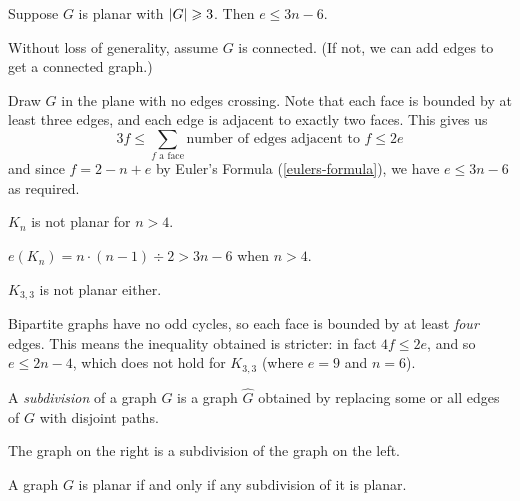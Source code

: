 \documentclass{article}
\begin{document}
\begin{corollary}
    Suppose $G$ is planar with $\left\lvert G \right\rvert \geqslant 3$. Then $e \leq 3n - 6$.
\end{corollary}

\begin{prf}
    Without loss of generality, assume $G$ is connected. (If not, we can add edges to get a connected graph.)
    
    Draw $G$ in the plane with no edges crossing. Note that each face is bounded by at least three edges, and each edge is adjacent to exactly two faces. This gives us
    \[
    3f \leq \sum_{f \text{ a face}} \text{number of edges adjacent to } f \leq 2e
    \]
    and since $f = 2 - n + e$ by Euler's Formula (\ref{eulers-formula}), we have $e \leq 3n-6$ as required.
\end{prf}

\begin{corollary}
    $K_n$ is not planar for $n > 4$.
\end{corollary}

\begin{prf}
    $e(K_n) = n \cdot (n-1) \div 2 > 3n-6$ when $n > 4$.
\end{prf}

\begin{corollary}
    $K_{3,3}$ is not planar either.
\end{corollary}

\begin{prf}
    Bipartite graphs have no odd cycles, so each face is bounded by at least \textit{four} edges. This means the inequality obtained is stricter: in fact $4f \leq 2e$, and so $e \leq 2n - 4$, which does not hold for $K_{3,3}$ (where $e = 9$ and $n = 6$).
\end{prf}

\begin{definition}[Subdivision]
    A \textit{subdivision} of a graph $G$ is a graph $\hat{G}$ obtained by replacing some or all edges of $G$ with disjoint paths.
    
    
    The graph on the right is a subdivision of the graph on the left.
\end{definition}

\begin{proposition}
    A graph $G$ is planar if and only if any subdivision of it is planar.
\end{proposition}
\end{document}
